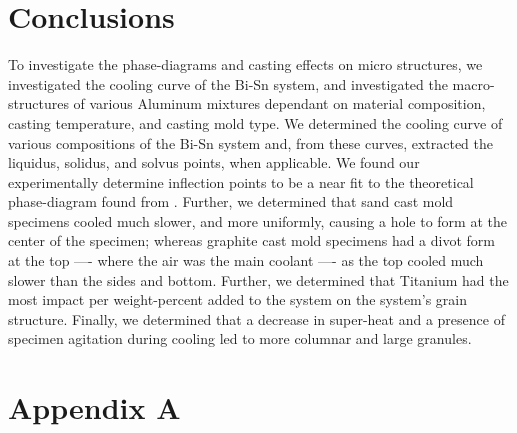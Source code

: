 \documentclass{article}
\begin{document}
\section{Conclusions}
To investigate the phase-diagrams and casting effects on micro structures, we investigated the cooling curve of the Bi-Sn system, and investigated the macro-structures of various Aluminum mixtures dependant on material composition, casting temperature, and casting mold type. We determined the cooling curve of various compositions of the Bi-Sn system and, from these curves, extracted the liquidus, solidus, and solvus points, when applicable. We found our experimentally determine inflection points to be a near fit to the theoretical phase-diagram found from \cite{nist}. Further, we determined that sand cast mold specimens cooled much slower, and more uniformly, causing a hole to form at the center of the specimen; whereas graphite cast mold specimens had a divot form at the top ---- where the air was the main coolant ---- as the top cooled much slower than the sides and bottom. Further, we determined that Titanium had the most impact per weight-percent added to the system on the system's grain structure. Finally, we determined that a decrease in super-heat and a presence of specimen agitation during cooling led to more columnar and large granules. 


\newpage
\section{Appendix A}\label{appendix}
\end{document}
